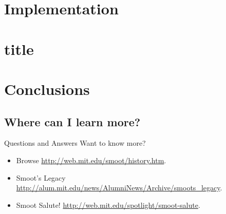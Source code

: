 \documentclass{beamer}
\begin{document}

\section{Implementation}

\section{title}
\section{Conclusions}
\subsection{Where can I learn more?}
\begin{frame}{Questions and Answers}
  Want to know more?

  \begin{itemize}
    \item Browse \url{http://web.mit.edu/smoot/history.htm}.
    \item Smoot's Legacy \url{http://alum.mit.edu/news/AlumniNews/Archive/smoots_legacy}.
    \item Smoot Salute! \url{http://web.mit.edu/spotlight/smoot-salute}.
  \end{itemize}
  
\end{frame}
\end{document}
